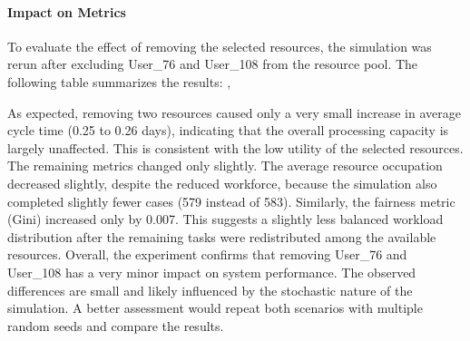 \documentclass[
  english,
  font=times,
  twocolumn,
]{tumarticle}
\begin{document}
\paragraph{Impact on Metrics}
To evaluate the effect of removing the selected resources, the simulation was rerun after excluding User\_76 and User\_108 from the resource pool. The following table summarizes the results: ,
\begin{table}[H]
\centering
{}
\caption{Simulated impact of removing User\_76 and User\_108}
\end{table}
As expected, removing two resources caused only a very small increase in average cycle time (0.25 to 0.26 days), indicating that the overall processing capacity is largely unaffected. This is consistent with the low utility of the selected resources. The remaining metrics changed only slightly. The average resource occupation decreased slightly, despite the reduced workforce, because the simulation also completed slightly fewer cases (579 instead of 583). Similarly, the fairness metric (Gini) increased only by 0.007. This suggests a slightly less balanced workload distribution after the remaining tasks were redistributed among the available resources.
Overall, the experiment confirms that removing User\_76 and User\_108 has a very minor impact on system performance. The observed differences are small and likely influenced by the stochastic nature of the simulation. A better assessment would repeat both scenarios with multiple random seeds and compare the results.





\appendix

\end{document}
